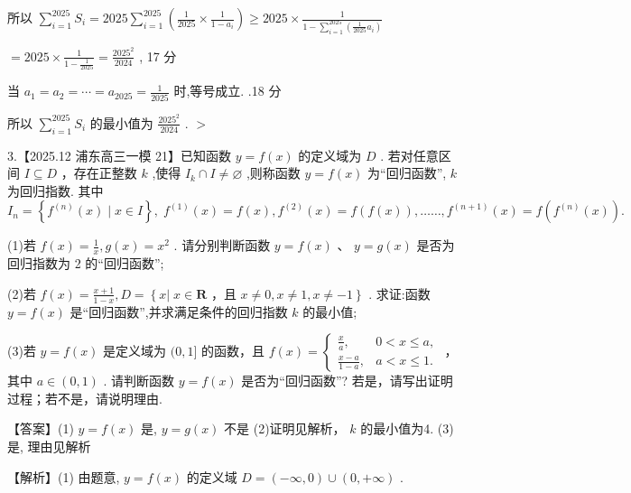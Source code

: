 \documentclass[10pt]{article}
\begin{document}
所以 \(\mathop{\sum }\limits_{{i = 1}}^{{2025}}{S}_{i} = {2025}\mathop{\sum }\limits_{{i = 1}}^{{2025}}\left( {\frac{1}{2025} \times  \frac{1}{1 - {a}_{i}}}\right)  \geq  {2025} \times  \frac{1}{1 - \mathop{\sum }\limits_{{i = 1}}^{{2025}}\left( {\frac{1}{2025}{a}_{i}}\right) }\)

\(= {2025} \times  \frac{1}{1 - \frac{1}{2025}} = \frac{{2025}^{2}}{2024}\) , 17 分

当 \({a}_{1} = {a}_{2} = \cdots  = {a}_{2025} = \frac{1}{2025}\) 时,等号成立. .18 分

所以 \(\mathop{\sum }\limits_{{i = 1}}^{{2025}}{S}_{i}\) 的最小值为 \(\frac{{2025}^{2}}{2024}\) . \(>\)

3.【2025.12 浦东高三一模 21】已知函数 \(y = f\left( x\right)\) 的定义域为 \(D\) . 若对任意区间 \(I \subseteq  D\) ，存在正整数 \(k\) ,使得 \({I}_{k} \cap  I \neq  \varnothing\) ,则称函数 \(y = f\left( x\right)\) 为“回归函数”, \(k\) 为回归指数. 其中 \({I}_{n} = \left\{  {{f}^{\left( n\right) }\left( x\right)  \mid  x \in  I}\right\}  ,\;{f}^{\left( 1\right) }\left( x\right)  = f\left( x\right) ,{f}^{\left( 2\right) }\left( x\right)  = f\left( {f\left( x\right) }\right) ,\ldots \ldots ,{f}^{\left( n + 1\right) }\left( x\right)  = f\left( {{f}^{\left( n\right) }\left( x\right) }\right) .\)

(1)若 \(f\left( x\right)  = \frac{1}{x},g\left( x\right)  = {x}^{2}\) . 请分别判断函数 \(y = f\left( x\right) \text{ 、 }y = g\left( x\right)\) 是否为回归指数为 2 的“回归函数”;

(2)若 \(f\left( x\right)  = \frac{x + 1}{1 - x},D = \left\{  {x\left| {\;x \in  \mathbf{R}}\right. \text{ ，且 }x \neq  0,x \neq  1,x \neq   - 1}\right\}\) . 求证:函数 \(y = f\left( x\right)\) 是“回归函数”,并求满足条件的回归指数 \(k\) 的最小值;

(3)若 \(y = f\left( x\right)\) 是定义域为 \((0,1\rbrack\) 的函数，且 \(f\left( x\right)  = \left\{  \begin{array}{ll} \frac{x}{a}, & 0 < x \leq  a, \\  \frac{x - a}{1 - a}, & a < x \leq  1. \end{array}\right.\) ，其中 \(a \in  \left( {0,1}\right)\) . 请判断函数 \(y = f\left( x\right)\) 是否为“回归函数”? 若是，请写出证明过程；若不是，请说明理由.

【答案】(1) \(y = f\left( x\right)\) 是, \(y = g\left( x\right)\) 不是 (2)证明见解析， \(k\) 的最小值为4. (3) 是, 理由见解析

【解析】(1) 由题意, \(y = f\left( x\right)\) 的定义域 \(D = \left( {-\infty ,0}\right)  \cup  \left( {0, + \infty }\right)\) .
\end{document}

